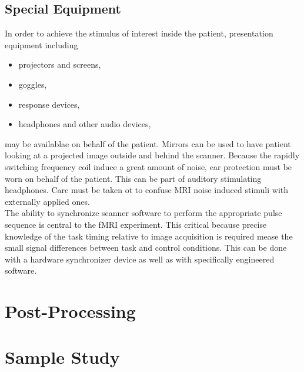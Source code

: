 \documentclass[a4paper]{scrartcl}
\begin{document}
\subsection{Special Equipment}
In order to achieve the stimulus of interest inside the patient, presentation equipment including
\begin{itemize}
  \item projectors and screens,
  \item goggles,
  \item response devices,
  \item headphones and other audio devices,
\end{itemize}
may be availablae on behalf of the patient. Mirrors can be used to have patient looking at a projected image outside and behind the scanner.
Because the rapidly switching frequency coil induce a great amount of noise, ear protection must be worn on behalf of the patient. This can be part of auditory stimulating headphones.
Care must be taken ot to confuse MRI noise induced stimuli with externally applied ones.\\
The ability to synchronize scanner software to perform the appropriate pulse sequence is central to the fMRI experiment. This critical because precise knowledge of the task timing relative to image acquisition is required mease the small signal differences between task and control conditions.\cite[3]{rigolo}
This can be done with a hardware synchronizer device as well as with specifically engineered software.


\section{Post-Processing}
\label{sec:post}


\section{Sample Study}
\label{sec:example}
\end{document}
